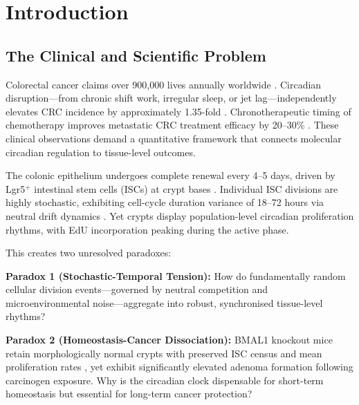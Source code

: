 \documentclass[11pt,letterpaper]{article}
\begin{document}
\newpage
\tableofcontents
\newpage


\section{Introduction}

\subsection{The Clinical and Scientific Problem}

Colorectal cancer claims over 900,000 lives annually worldwide \citep{sung2021global}. Circadian disruption---from chronic shift work, irregular sleep, or jet lag---independently elevates CRC incidence by approximately 1.35-fold \citep{papagiannakopoulos2016circadian, schernhammer2003night}. Chronotherapeutic timing of chemotherapy improves metastatic CRC treatment efficacy by 20--30\% \citep{innominato2014circadian, levi1997randomised}. These clinical observations demand a quantitative framework that connects molecular circadian regulation to tissue-level outcomes.

The colonic epithelium undergoes complete renewal every 4--5 days, driven by Lgr5$^+$ intestinal stem cells (ISCs) at crypt bases \citep{barker2007identification}. Individual ISC divisions are highly stochastic, exhibiting cell-cycle duration variance of 18--72 hours via neutral drift dynamics \citep{snippert2010intestinal, lopezgarcia2010intestinal}. Yet crypts display population-level circadian proliferation rhythms, with EdU incorporation peaking during the active phase.

This creates two unresolved paradoxes:

\textbf{Paradox 1 (Stochastic-Temporal Tension):} How do fundamentally random cellular division events---governed by neutral competition and microenvironmental noise---aggregate into robust, synchronised tissue-level rhythms?

\textbf{Paradox 2 (Homeostasis-Cancer Dissociation):} BMAL1 knockout mice retain morphologically normal crypts with preserved ISC census and mean proliferation rates \citep{stokes2017circadian}, yet exhibit significantly elevated adenoma formation following carcinogen exposure. Why is the circadian clock dispensable for short-term homeostasis but essential for long-term cancer protection?
\end{document}
